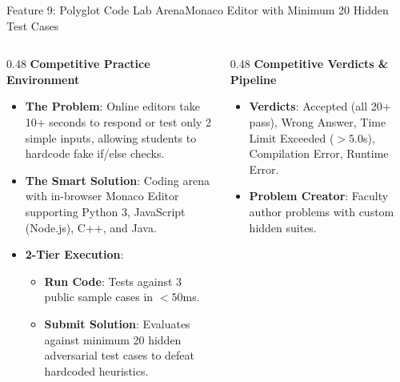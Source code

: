 \documentclass[aspectratio=169,10pt]{beamer}
\begin{document}
\begin{frame}[t]{Feature 9: Polyglot Code Lab Arena}{Monaco Editor with Minimum 20 Hidden Test Cases}
  \begin{columns}[t]
    \begin{column}{0.48\textwidth}
      {\fontsize{9.0}{11.0}\selectfont\textbf{\textcolor{KoinexaRed}{Competitive Practice Environment}}}\par\vspace{1.5pt}
      \begin{itemize}\setlength{\itemsep}{1.5pt}
        \item {\fontsize{8.0}{9.8}\selectfont \textbf{The Problem}: Online editors take 10+ seconds to respond or test only 2 simple inputs, allowing students to hardcode fake if/else checks.}
        \item {\fontsize{8.0}{9.8}\selectfont \textbf{The Smart Solution}: Coding arena with in-browser Monaco Editor supporting Python 3, JavaScript (Node.js), C++, and Java.}
        \item {\fontsize{8.0}{9.8}\selectfont \textbf{2-Tier Execution}:}
        \begin{itemize}\setlength{\itemsep}{1.0pt}
          \item {\fontsize{7.5}{9.2}\selectfont \textbf{Run Code}: Tests against 3 public sample cases in $< 50$ms.}
          \item {\fontsize{7.5}{9.2}\selectfont \textbf{Submit Solution}: Evaluates against minimum 20 hidden adversarial test cases to defeat hardcoded heuristics.}
        \end{itemize}
      \end{itemize}
    \end{column}
    \begin{column}{0.48\textwidth}
      {\fontsize{9.0}{11.0}\selectfont\textbf{\textcolor{KoinexaOrange}{Competitive Verdicts \& Pipeline}}}\par\vspace{1.5pt}
      \begin{itemize}\setlength{\itemsep}{1.2pt}
        \item {\fontsize{8.0}{9.8}\selectfont \textbf{Verdicts}: Accepted (all 20+ pass), Wrong Answer, Time Limit Exceeded ($> 5.0$s), Compilation Error, Runtime Error.}
        \item {\fontsize{8.0}{9.8}\selectfont \textbf{Problem Creator}: Faculty author problems with custom hidden suites.}

\end{itemize}
\end{column}
\end{columns}
\end{frame}
\end{document}
